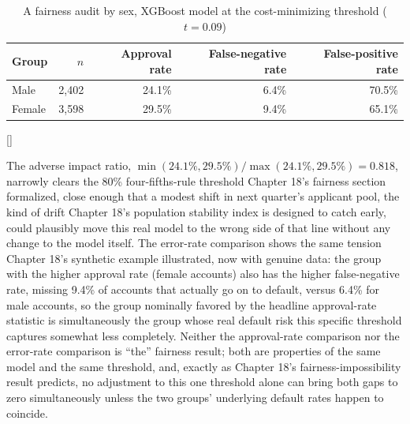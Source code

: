 \documentclass[../ai_in_finance]{subfiles}
\begin{document}
\begin{table}[htbp]
\centering
\begin{lrbox}{\bookmeasuredbox}
\begin{tabular}{lrrrr}
\toprule
Group & $n$ & Approval rate & False-negative rate & False-positive rate \\
\midrule
Male & 2{,}402 & 24.1\% & 6.4\% & 70.5\% \\
Female & 3{,}598 & 29.5\% & 9.4\% & 65.1\% \\
\bottomrule
\end{tabular}
\end{lrbox}
\ifdim\wd\bookmeasuredbox<0.65\linewidth
\setlength{\bookcapwidth}{0.65\linewidth}
\else
\setlength{\bookcapwidth}{\wd\bookmeasuredbox}
\fi
{}[\bookcapwidth]{
\usebox{\bookmeasuredbox}
}{
\caption{A fairness audit by sex, XGBoost model at the cost-minimizing threshold ($t=0.09$)}
\label{tab:capstone_fairness}
}
\end{table}

The adverse impact ratio, $\min(24.1\%, 29.5\%)/\max(24.1\%, 29.5\%) = 0.818$, narrowly clears the 80\% four-fifths-rule threshold Chapter 18's fairness section formalized, close enough that a modest shift in next quarter's applicant pool, the kind of drift Chapter 18's population stability index is designed to catch early, could plausibly move this real model to the wrong side of that line without any change to the model itself. The error-rate comparison shows the same tension Chapter 18's synthetic example illustrated, now with genuine data: the group with the higher approval rate (female accounts) also has the higher false-negative rate, missing 9.4\% of accounts that actually go on to default, versus 6.4\% for male accounts, so the group nominally favored by the headline approval-rate statistic is simultaneously the group whose real default risk this specific threshold captures somewhat less completely. Neither the approval-rate comparison nor the error-rate comparison is ``the'' fairness result; both are properties of the same model and the same threshold, and, exactly as Chapter 18's fairness-impossibility result predicts, no adjustment to this one threshold alone can bring both gaps to zero simultaneously unless the two groups' underlying default rates happen to coincide.
\end{document}
